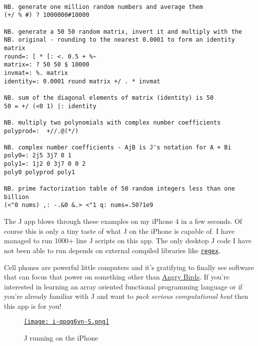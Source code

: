 \begin{lstlisting}[language=jdoc, frame=single,framerule=0pt,label=lst:scr3026X0]

NB. generate one million random numbers and average them
(+/ % #) ? 1000000#10000
   
NB. generate a 50 50 random matrix, invert it and multiply with the 
NB. original - rounding to the nearest 0.0001 to form an identity matrix 
round=: [ * [: <. 0.5 + %~
matrix=: ? 50 50 $ 10000
invmat=: %. matrix
identity=: 0.0001 round matrix +/ . * invmat
   
NB. sum of the diagonal elements of matrix (identity) is 50 
50 = +/ (<0 1) |: identity
   
NB. multiply two polynomials with complex number coefficients
polyprod=:  +//.@(*/) 

NB. complex number coefficients - AjB is J's notation for A + Bi
poly0=: 2j5 3j7 0 1
poly1=: 1j2 0 3j7 0 0 2
poly0 polyprod poly1

NB. prime factorization table of 50 random integers less than one billion
(<"0 nums) ,: -.&0 &.> <"1 q: nums=.50?1e9
\end{lstlisting}

The J app blows through these examples on my iPhone 4 in a few seconds.
Of course this is only a tiny taste of what J on the iPhone is capable
of. I have managed to run 1000+ line J scripts on this app. The only
desktop J code I have not been able to run depends on external compiled
libraries like
\href{http://www.jsoftware.com/help/user/script\_regex.htm}{\texttt{regex}}.

Cell phones are powerful little computers and it's gratifying to finally
see software that can focus that power on something other than
\href{http://itunes.apple.com/us/app/angry-birds/id343200656?mt=8}{Angry
Birds}. If you're interested in learning an array oriented functional
programming language or if you're already familiar with J and want to
\emph{pack serious computational heat} then this app is for you!

\begin{figure}[htbp]
\centering
\href{http://www.jsoftware.com/}{\texttt{[image: i-qpqg6vn-S.png]}}
\caption{J running on the iPhone}
\label{fig:3026X1}
\end{figure}




